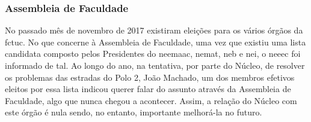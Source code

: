 
\subsubsection{Assembleia de Faculdade}

No passado mês de novembro de 2017 existiram eleições para os vários órgãos da \acrshort{fctuc}. No que concerne à Assembleia de Faculdade, uma vez que existiu uma lista candidata composto pelos Presidentes do \acrshort{neemaac}, \acrshort{nemat}, \acrshort{neb} e \acrshort{nei}, o \acrshort{neeec} foi informado de tal. Ao longo do ano, na tentativa, por parte do Núcleo, de resolver os problemas das estradas do Polo 2, João Machado, um dos membros efetivos eleitos por essa lista indicou querer falar do assunto através da Assembleia de Faculdade, algo que nunca chegou a acontecer. Assim, a relação do Núcleo com este órgão é nula sendo, no entanto, importante melhorá-la no futuro.